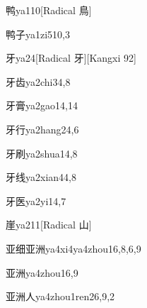 \begin{entry}{鸭}{ya1}{10}[Radical 鳥]
\end{entry}

\begin{entry}{鸭子}{ya1zi5}{10,3}
\end{entry}

\begin{entry}{牙}{ya2}{4}[Radical 牙][Kangxi 92]
\end{entry}

\begin{entry}{牙齿}{ya2chi3}{4,8}
\end{entry}

\begin{entry}{牙膏}{ya2gao1}{4,14}
\end{entry}

\begin{entry}{牙行}{ya2hang2}{4,6}
\end{entry}

\begin{entry}{牙刷}{ya2shua1}{4,8}
\end{entry}

\begin{entry}{牙线}{ya2xian4}{4,8}
\end{entry}

\begin{entry}{牙医}{ya2yi1}{4,7}
\end{entry}

\begin{entry}{崖}{ya2}{11}[Radical 山]
\end{entry}

\begin{entry}{亚细亚洲}{ya4xi4ya4zhou1}{6,8,6,9}
\end{entry}

\begin{entry}{亚洲}{ya4zhou1}{6,9}
\end{entry}

\begin{entry}{亚洲人}{ya4zhou1ren2}{6,9,2}
\end{entry}

